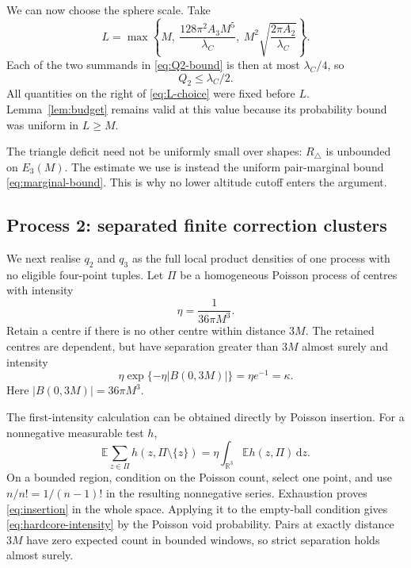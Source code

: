 \documentclass[11pt,a4paper]{article}
\numberwithin{equation}{section}
\theoremstyle{definition}
\theoremstyle{remark}
\newcommand{\R}{\mathbb R}
\newcommand{\E}{\mathbb E}
\newcommand{\dd}{\,\mathrm d}
\begin{document}
We can now choose the sphere scale. Take
\begin{equation}
 L=\max\left\{
 M,\ \frac{128\pi^2A_3M^5}{\lambda_C},\
 M^2\sqrt{\frac{2\pi A_2}{\lambda_C}}
 \right\}.
 \label{eq:L-choice}
\end{equation}
Each of the two summands in \eqref{eq:Q2-bound} is then at most
$\lambda_C/4$, so
\begin{equation}
 Q_2\leq\lambda_C/2.
 \label{eq:small-budget}
\end{equation}
All quantities on the right of \eqref{eq:L-choice} were fixed before
$L$. Lemma~\ref{lem:budget} remains valid at this value because its
probability bound was uniform in $L\geq M$.

The triangle deficit need not be uniformly small over shapes:
$R_\triangle$ is unbounded on $E_3(M)$. The estimate we use is instead the
uniform pair-marginal bound \eqref{eq:marginal-bound}. This is why no lower
altitude cutoff enters the argument.

\subsection{Process 2: separated finite correction clusters}
\label{subsec:correction}

We next realise $q_2$ and $q_3$ as the full local product densities of one
process with no eligible four-point tuples. Let $\Pi$ be a homogeneous
Poisson process of centres with intensity
\begin{equation}
 \eta=\frac1{36\pi M^3}.
 \label{eq:eta}
\end{equation}
Retain a centre if there is no other centre within distance $3M$. The
retained centres are dependent, but have separation greater than $3M$
almost surely and intensity
\begin{equation}
 \eta\exp\{-\eta|B(0,3M)|\}=\eta e^{-1}=\kappa.
 \label{eq:hardcore-intensity}
\end{equation}
Here $|B(0,3M)|=36\pi M^3$.

The first-intensity calculation can be obtained directly by Poisson
insertion. For a nonnegative measurable test $h$,
\begin{equation}
 \E\sum_{z\in\Pi}h(z,\Pi\setminus\{z\})
 =\eta\int_{\R^3}\E h(z,\Pi)\dd z.
 \label{eq:insertion}
\end{equation}
On a bounded region, condition on the Poisson count, select one point,
and use $n/n!=1/(n-1)!$ in the resulting nonnegative series.
Exhaustion proves \eqref{eq:insertion} in the whole space. Applying it
to the empty-ball condition gives \eqref{eq:hardcore-intensity} by the
Poisson void probability. Pairs at exactly distance $3M$ have zero
expected count in bounded windows, so strict separation holds almost
surely.
\end{document}
